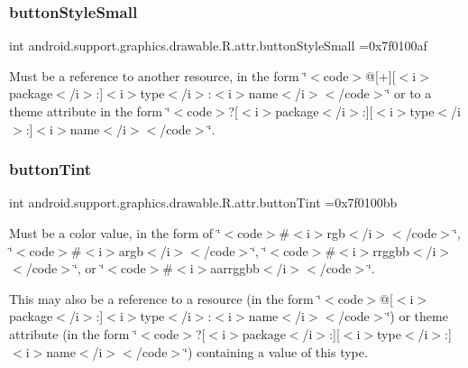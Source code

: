 \subsubsection{\texorpdfstring{button\+Style\+Small}{buttonStyleSmall}}
{\footnotesize\ttfamily int android.\+support.\+graphics.\+drawable.\+R.\+attr.\+button\+Style\+Small =0x7f0100af\hspace{0.3cm}{\ttfamily [static]}}

Must be a reference to another resource, in the form \char`\"{}$<$code$>$@\mbox{[}+\mbox{]}\mbox{[}$<$i$>$package$<$/i$>$\+:\mbox{]}$<$i$>$type$<$/i$>$\+:$<$i$>$name$<$/i$>$$<$/code$>$\char`\"{} or to a theme attribute in the form \char`\"{}$<$code$>$?\mbox{[}$<$i$>$package$<$/i$>$\+:\mbox{]}\mbox{[}$<$i$>$type$<$/i$>$\+:\mbox{]}$<$i$>$name$<$/i$>$$<$/code$>$\char`\"{}. \mbox{\label{classandroid_1_1support_1_1graphics_1_1drawable_1_1R_1_1attr_a409acd4db013848e27f5dedf1559df6f}} 
\subsubsection{\texorpdfstring{button\+Tint}{buttonTint}}
{\footnotesize\ttfamily int android.\+support.\+graphics.\+drawable.\+R.\+attr.\+button\+Tint =0x7f0100bb\hspace{0.3cm}{\ttfamily [static]}}

Must be a color value, in the form of \char`\"{}$<$code$>$\#$<$i$>$rgb$<$/i$>$$<$/code$>$\char`\"{}, \char`\"{}$<$code$>$\#$<$i$>$argb$<$/i$>$$<$/code$>$\char`\"{}, \char`\"{}$<$code$>$\#$<$i$>$rrggbb$<$/i$>$$<$/code$>$\char`\"{}, or \char`\"{}$<$code$>$\#$<$i$>$aarrggbb$<$/i$>$$<$/code$>$\char`\"{}. 

This may also be a reference to a resource (in the form \char`\"{}$<$code$>$@\mbox{[}$<$i$>$package$<$/i$>$\+:\mbox{]}$<$i$>$type$<$/i$>$\+:$<$i$>$name$<$/i$>$$<$/code$>$\char`\"{}) or theme attribute (in the form \char`\"{}$<$code$>$?\mbox{[}$<$i$>$package$<$/i$>$\+:\mbox{]}\mbox{[}$<$i$>$type$<$/i$>$\+:\mbox{]}$<$i$>$name$<$/i$>$$<$/code$>$\char`\"{}) containing a value of this type. \mbox{\label{classandroid_1_1support_1_1graphics_1_1drawable_1_1R_1_1attr_a73d0d1895909d66c3ba9ce5573ea0cce}} 
